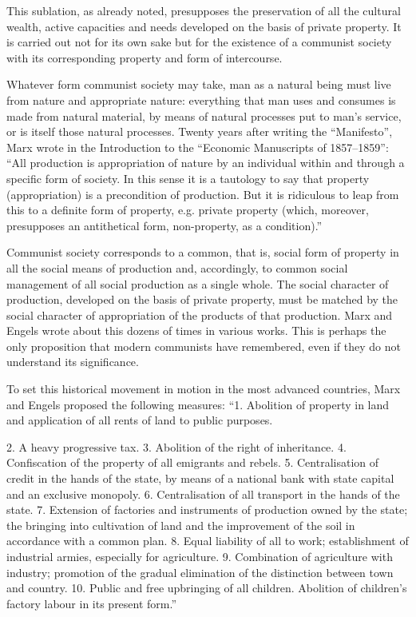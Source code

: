 \documentclass[../main]{subfiles}
\begin{document}
This sublation, as already noted, presupposes the preservation of all the cultural wealth, active capacities and needs developed on the basis of private property. It is carried out not for its own sake but for the existence of a communist society with its corresponding property and form of intercourse.

Whatever form communist society may take, man as a natural being must live from nature and appropriate nature: everything that man uses and consumes is made from natural material, by means of natural processes put to man’s service, or is itself those natural processes. Twenty years after writing the “Manifesto”, Marx wrote in the Introduction to the “Economic Manuscripts of 1857–1859”: “All production is appropriation of nature by an individual within and through a specific form of society. In this sense it is a tautology to say that property (appropriation) is a precondition of production. But it is ridiculous to leap from this to a definite form of property, e.g. private property (which, moreover, presupposes an antithetical form, non-property, as a condition).”

Communist society corresponds to a common, that is, social form of property in all the social means of production and, accordingly, to common social management of all social production as a single whole. The social character of production, developed on the basis of private property, must be matched by the social character of appropriation of the products of that production. Marx and Engels wrote about this dozens of times in various works. This is perhaps the only proposition that modern communists have remembered, even if they do not understand its significance.

To set this historical movement in motion in the most advanced countries, Marx and Engels proposed the following measures: “1. Abolition of property in land and application of all rents of land to public purposes.

2. A heavy progressive tax. 3. Abolition of the right of inheritance. 4. Confiscation of the property of all emigrants and rebels. 5. Centralisation of credit in the hands of the state, by means of a national bank with state capital and an exclusive monopoly. 6. Centralisation of all transport in the hands of the state. 7. Extension of factories and instruments of production owned by the state; the bringing into cultivation of land and the improvement of the soil in accordance with a common plan. 8. Equal liability of all to work; establishment of industrial armies, especially for agriculture. 9. Combination of agriculture with industry; promotion of the gradual elimination of the distinction between town and country. 10. Public and free upbringing of all children. Abolition of children’s factory labour in its present form.”
\end{document}
